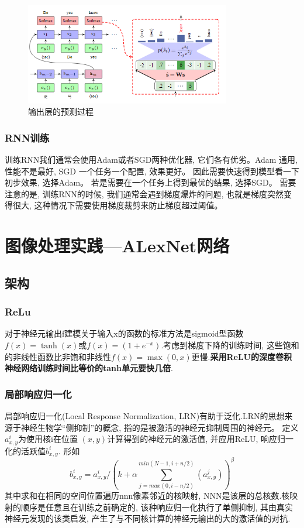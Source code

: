 \documentclass[a4paper]{article}
\begin{document}
    \begin{figure}[htp]
        \centering
        \includegraphics[width=0.8\textwidth]{outputpredict.png}
        \caption{输出层的预测过程} 
        \end{figure}

\subsubsection{RNN训练}
训练RNN我们通常会使用Adam或者SGD两种优化器, 它们各有优劣。Adam 通用, 性能不是最好, SGD  一个任务一个配置, 效果更好。
因此需要快速得到模型看一下初步效果, 选择Adam。
若是需要在一个任务上得到最优的结果, 选择SGD。
需要注意的是, 训练RNN的时候, 我们通常会遇到梯度爆炸的问题, 也就是梯度突然变得很大, 这种情况下需要使用梯度裁剪来防止梯度超过阈值。

\section{图像处理实践---ALexNet网络}
 
\subsection{架构}
\subsubsection{ReLu}
对于神经元输出f建模关于输入x的函数的标准⽅法是sigmoid型函数$f(x)=\tanh(x)$或$f(x)=(1+e^{-x})$.考虑到梯度下降的训练时间, 这些饱和的非线性函数比非饱和非线性$f(x)=\max(0, x)$更慢.\textbf{采用ReLU的深度卷积神经网络训练时间比等价的tanh单元要快几倍}.

\subsubsection{局部响应归一化}

局部响应归一化(Local Response Normalization, LRN)有助于泛化.LRN的思想来源于神经生物学“侧抑制”的概念, 指的是被激活的神经元抑制周围的神经元。
定义$a_{x, y}^i$为使用核i在位置 $(x, y)$计算得到的神经元的激活值, 并应用ReLU, 响应归一化的活跃值$b_{x, y}^i $. 形如
$$b_{x, y}^i = a_{x, y}^i/(k + \alpha\sum_{j = max(0,  i-n/2)}^{min(N-1,  i + n/2)}(a_{x, y}^j))^\beta$$
其中求和在相同的空间位置遍历nnn像素邻近的核映射, NNN是该层的总核数.核映射的顺序是任意且在训练之前确定的, 该种响应归一化执行了单侧抑制, 其由真实神经元发现的该类启发, 产生了与不同核计算的神经元输出的大的激活值的对抗. 
\end{document}
